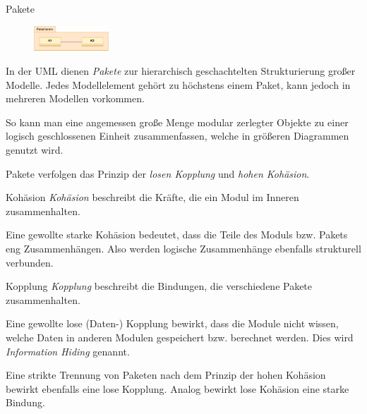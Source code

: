 \begin{defi}{Pakete}
    \begin{figure}
        \centering
        \includegraphics[width=0.25\textwidth]{includes/figures/defi_diagrams_class_package.pdf}
    \end{figure}
    In der UML dienen \emph{Pakete} zur hierarchisch geschachtelten Strukturierung großer Modelle.
    Jedes Modellelement gehört zu höchstens einem Paket, kann jedoch in mehreren Modellen vorkommen.

    So kann man eine angemessen große Menge modular zerlegter Objekte zu einer logisch geschlossenen Einheit zusammenfassen, welche in größeren Diagrammen genutzt wird.

    Pakete verfolgen das Prinzip der \emph{losen Kopplung} und \emph{hohen Kohäsion}.
\end{defi}

\begin{defi}{Kohäsion}
    \emph{Kohäsion} beschreibt die Kräfte, die ein Modul im Inneren zusammenhalten.

    Eine gewollte starke Kohäsion bedeutet, dass die Teile des Moduls bzw. Pakets eng Zusammenhängen.
    Also werden logische Zusammenhänge ebenfalls strukturell verbunden.
\end{defi}

\begin{defi}{Kopplung}
    \emph{Kopplung} beschreibt die Bindungen, die verschiedene Pakete zusammenhalten.

    Eine gewollte lose (Daten-) Kopplung bewirkt, dass die Module nicht wissen, welche Daten in anderen Modulen gespeichert bzw. berechnet werden.
    Dies wird \emph{Information Hiding} genannt.

    Eine strikte Trennung von Paketen nach dem Prinzip der hohen Kohäsion bewirkt ebenfalls eine lose Kopplung.
    Analog bewirkt lose Kohäsion eine starke Bindung.
\end{defi}

